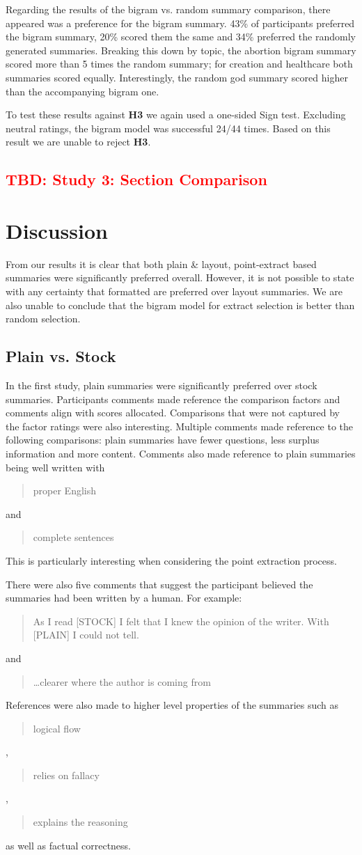       Regarding the results of the bigram vs. random summary comparison, there appeared was a preference for the bigram summary. 43\% of participants preferred the bigram summary, 20\% scored them the same and 34\% preferred the randomly generated summaries. Breaking this down by topic, the abortion bigram summary scored more than 5 times the random summary; for creation and healthcare both summaries scored equally. Interestingly, the random god summary scored higher than the accompanying bigram one.

      To test these results against \textbf{H3} we again used a one-sided Sign test. Excluding neutral ratings, the bigram model was successful 24/44 times. Based on this result we are unable to reject \textbf{H3}.

    \tocless\subsection{\textcolor{red}{TBD: Study 3: Section Comparison}}

  \section{Discussion}
    From our results it is clear that both plain \& layout, point-extract based summaries were significantly preferred overall. However, it is not possible to state with any certainty that formatted are preferred over layout summaries. We are also unable to conclude that the bigram model for extract selection is better than random selection.

    \tocless\subsection{Plain vs. Stock}
      In the first study, plain summaries were significantly preferred over stock summaries. Participants comments made reference the comparison factors and comments align with scores allocated. Comparisons that were not captured by the factor ratings were also interesting. Multiple comments made reference to the following comparisons: plain summaries have fewer questions, less surplus information and more content. Comments also made reference to plain summaries being well written with \blockquote{proper English} and \blockquote{complete sentences}. This is particularly interesting when considering the point extraction process.

      There were also five comments that suggest the participant believed the summaries had been written by a human. For example: \blockquote{As I read [STOCK] I felt that I knew the opinion of the writer. With [PLAIN] I could not tell.} and \blockquote{\dots clearer where the author is coming from}. References were also made to higher level properties of the summaries such as \blockquote{logical flow}, \blockquote{relies on fallacy}, \blockquote{explains the reasoning} as well as factual correctness.

